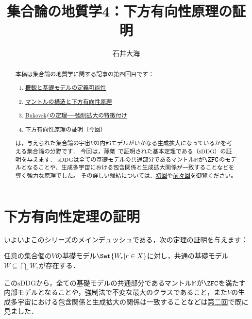 \documentclass[a4j,leqno]{ltjsarticle}
\title{集合論の地質学4：下方有向性原理の証明}
\author{石井大海}
\renewcommand{\emph}[1]{\textgt{\textsf{#1}}}
\newcommand{\mantle}{\mathbb{M}}
\newcommand{\M}{\mantle}
\newcommand{\sDDG}{\mathord{\mathrm{sDDG}}}
\begin{document}
\maketitle

\begin{abstract}
 本稿は集合論の地質学に関する記事の第四回目です：
 \begin{enumerate}[label={\arabic*.}]
  \item \href{https://konn-san.com/math/geology-ground-definability.html}{概観と基礎モデルの定義可能性}
  \item \href{https://konn-san.com/math/geology-mantle-and-ddg.html}{マントルの構造と下方有向性原理}
  \item \href{https://konn-san.com/math/geology-bukovsky-theorem.html}{Bukovsk\'{y}の定理──強制拡大の特徴付け}
  \item 下方有向性原理の証明（今回）
 \end{enumerate} 
 \emph{集合論の地質学}は，与えられた集合論の宇宙$V$の内部モデルがいかなる生成拡大になっているかを考える集合論の分野です．
 今回は，薄葉~\cite{Usuba:2017fp}で証明された基本定理である\emph{下方有向性原理}（$\mathrm{sDDG}$）の証明を与えます．
 $\mathrm{sDDG}$は全ての基礎モデルの共通部分であるマントル$\mathbb{M}$が$\ZFC$のモデルとなることや、生成多宇宙における包含関係と生成拡大関係が一致することなどを導く強力な原理でした。
 その詳しい帰結については、\href{https://konn-san.com/math/geology-ground-definability.html}{初回}や\href{https://konn-san.com/math/geology-mantle-and-ddg.html}{前々回}を御覧ください。
\end{abstract}
\section{下方有向性定理の証明}
いよいよこのシリーズのメインデュッシュである，次の定理の証明を与えます：
\begin{theorem}
 任意の集合個の$V$の基礎モデル$\Set{W_r | r \in X}$に対し，共通の基礎モデル$W \subseteq \bigcap_r W_r$が存在する．
\end{theorem}
この$\sDDG$から，全ての基礎モデルの共通部分であるマントル$\M$が$\ZFC$を満たす内部モデルとなることや，強制法で不変な最大のクラスであること，また$V$の生成多宇宙における包含関係と生成拡大の関係は一致することなどは\href{https://konn-san.com/math/geology-mantle-and-ddg.html}{第二回}で既に見ました．
\end{document}
